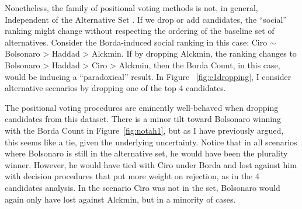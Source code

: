 \documentclass[hidelinks,11pt]{article} \usepackage[utf8]{inputenc}
\begin{document}
Nonetheless, the family of positional voting methods is not, in general, Independent
of the Alternative Set \parencite{kaminski2015empirical}. If we drop or add
candidates, the ``social'' ranking might change without respecting the ordering
of the baseline set of alternatives. Consider the Borda-induced social ranking
in this case: Ciro \( \sim \) Bolsonaro > Haddad > Alckmin. If by dropping
Alckmin, the ranking changes to Bolsonaro > Haddad > Ciro > Alckmin, then the
Borda Count, in this case, would be inducing a ``paradoxical'' result. In Figure
~\ref{fig:c1dropping}, I consider alternative scenarios by dropping one of the
top 4 candidates.

The positional voting procedures are eminently well-behaved when dropping
candidates from this dataset. There is a minor tilt toward Bolsonaro winning
with the Borda Count in Figure~\ref{fig:notah1}, but as I have previously
argued, this seems like a tie, given the underlying uncertainty. Notice that in
all scenarios where Bolsonaro is still in the alternative set, he would have
been the plurality winner. However, he would have tied with Ciro under Borda and
lost against him with decision procedures that put more weight on rejection, as
in the 4 candidates analysis. In the scenario Ciro was not in the set, Bolsonaro
would again only have lost against Alckmin, but in a minority of cases.
\end{document}
